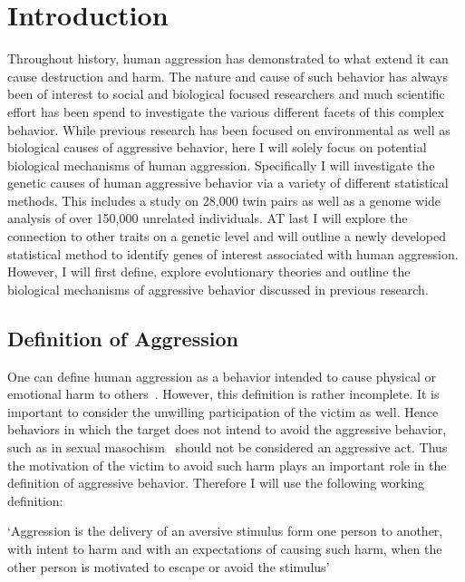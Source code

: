 \chapter{Introduction}
\label{cha:introduction}

Throughout history, human aggression has demonstrated to what extend it can cause destruction and harm.
The nature and cause of such behavior has always been of interest to social and biological focused researchers and much scientific effort has been spend to investigate the various different facets of this complex behavior.
While previous research has been focused on environmental as well as biological causes of aggressive behavior, here I will solely focus on potential biological mechanisms of human aggression.
Specifically I will investigate the genetic causes of human aggressive behavior via a variety of different statistical methods.
This includes a study on 28,000 twin pairs as well as a genome wide analysis of over 150,000 unrelated individuals.
AT last I will explore the connection to other traits on a genetic level and will outline a newly developed statistical method to identify genes of interest associated with human aggression.
However, I will first define, explore evolutionary theories and outline the biological mechanisms of aggressive behavior discussed in previous research. 

\section{Definition of Aggression}
\label{sec:overview_of_reseach_in_aggression}

One can define human aggression as a behavior intended to cause physical or emotional harm to others~\cite{Anderson2002}.
However, this definition is rather incomplete.
It is important to consider the unwilling participation of the victim as well.
Hence behaviors in which the target does not intend to avoid the aggressive behavior, such as in sexual masochism~\cite{Berkowitz1993,Baumeister1989,Baron2007,Geen2001} should not be considered an aggressive act.
Thus the motivation of the victim to avoid such harm plays an important role in the definition of aggressive behavior.  
Therefore I will use the following working definition:
\begin{mydef}[Aggression]\label{def:aggression}
	`Aggression is the delivery of an aversive stimulus form one person to another, with intent to harm and with an expectations of causing such harm, when the other person is motivated to escape or avoid the stimulus'~\cite{Geen2001}
\end{mydef}


